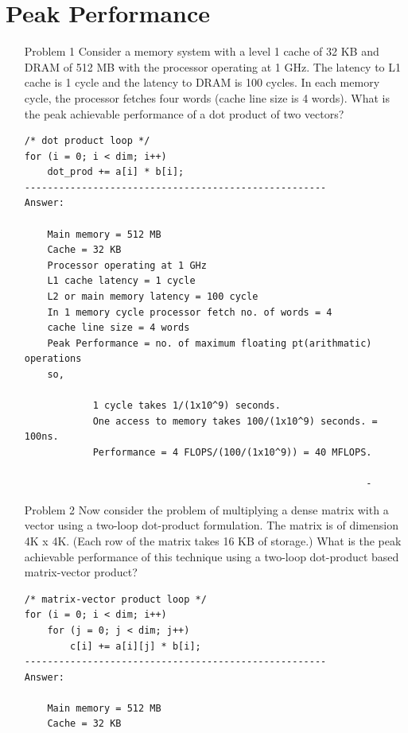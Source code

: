 \documentclass{sem5}
\author{Dilip Puri}
\begin{document}
\section*{Peak Performance}
\begin{enumerate}
\item[Problem 1] Consider a memory system with a level 1 cache of 32 KB and DRAM of 512 MB with the processor operating at 1 GHz. The latency to L1 cache is 1 cycle and the latency to DRAM is 100 cycles. In each memory cycle, the processor fetches four words (cache line size is 4 words). What is the peak achievable performance of a dot product of two vectors?
\lstset{language=C}
\begin{lstlisting}[frame=single]
/* dot product loop */
for (i = 0; i < dim; i++)
	dot_prod += a[i] * b[i];
-----------------------------------------------------
Answer:

	Main memory = 512 MB
	Cache = 32 KB
	Processor operating at 1 GHz
	L1 cache latency = 1 cycle
	L2 or main memory latency = 100 cycle
	In 1 memory cycle processor fetch no. of words = 4
	cache line size = 4 words
	Peak Performance = no. of maximum floating pt(arithmatic) operations
	so,
		
			1 cycle takes 1/(1x10^9) seconds.
			One access to memory takes 100/(1x10^9) seconds. = 100ns.
			Performance = 4 FLOPS/(100/(1x10^9)) = 40 MFLOPS.
			
															-
\end{lstlisting}
\item[Problem 2] Now consider the problem of multiplying a dense matrix with a vector using a two-loop dot-product formulation. The matrix is of dimension 4K x 4K. (Each row of the matrix takes 16 KB of storage.) What is the peak achievable performance of this technique using a two-loop dot-product based matrix-vector product?
\lstset{language=C}
\begin{lstlisting}[frame=single]
/* matrix-vector product loop */
for (i = 0; i < dim; i++)
	for (j = 0; j < dim; j++)
		c[i] += a[i][j] * b[i];
-----------------------------------------------------
Answer:

	Main memory = 512 MB
	Cache = 32 KB

\end{lstlisting}
\end{enumerate}
\end{document}
